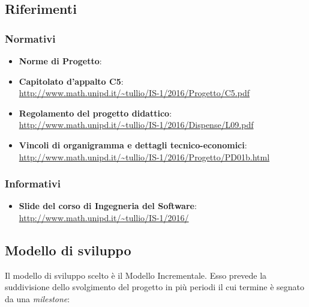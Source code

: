 \subsection{Riferimenti}

\subsubsection{Normativi}
\begin{itemize}
\item \textbf{Norme di Progetto}: \\ \normediprogetto
\item \textbf{Capitolato d'appalto C5}: \\ \url{http://www.math.unipd.it/~tullio/IS-1/2016/Progetto/C5.pdf}
\item \textbf{Regolamento del progetto didattico}: \\ \url{http://www.math.unipd.it/~tullio/IS-1/2016/Dispense/L09.pdf}
\item \textbf{Vincoli di organigramma e dettagli tecnico-economici}: \\ \url{http://www.math.unipd.it/~tullio/IS-1/2016/Progetto/PD01b.html}

\end{itemize}


\subsubsection{Informativi}
\begin{itemize}
\item \textbf{Slide del corso di Ingegneria del Software}: \\  \url{http://www.math.unipd.it/~tullio/IS-1/2016/ }
\end{itemize}

\subsection{Modello di sviluppo}

Il modello di sviluppo scelto è il Modello Incrementale. Esso prevede la suddivisione dello svolgimento del progetto in più periodi il cui termine è segnato da una \textit{milestone}:

